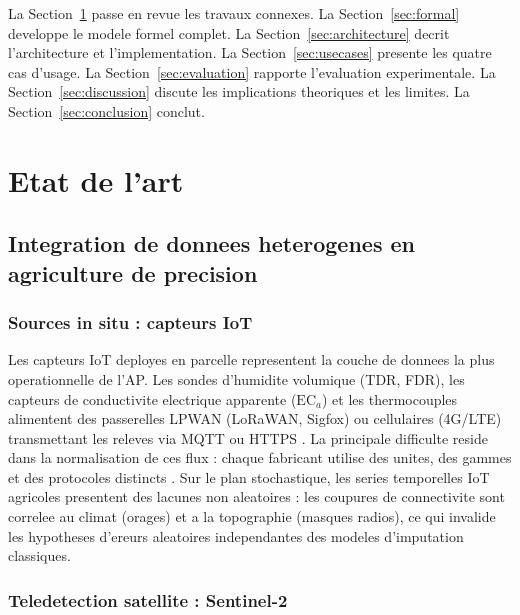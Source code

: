 \documentclass[12pt,a4paper]{article}
\theoremstyle{plain}
\theoremstyle{definition}
\theoremstyle{remark}
\begin{document}
	La Section~\ref{sec:related} passe en revue les travaux connexes.
	La Section~\ref{sec:formal} developpe le modele formel complet.
	La Section~\ref{sec:architecture} decrit l'architecture et l'implementation.
	La Section~\ref{sec:usecases} presente les quatre cas d'usage.
	La Section~\ref{sec:evaluation} rapporte l'evaluation experimentale.
	La Section~\ref{sec:discussion} discute les implications theoriques
	et les limites. La Section~\ref{sec:conclusion} conclut.
	
	\section{Etat de l'art}
	\label{sec:related}
	
	\subsection{Integration de donnees heterogenes en agriculture de precision}
	
	\subsubsection{Sources in situ : capteurs IoT}
	
	Les capteurs IoT deployes en parcelle representent la couche de donnees
	la plus operationnelle de l'AP. Les sondes d'humidite volumique (TDR,
	FDR), les capteurs de conductivite electrique apparente ($\text{EC}_a$)
	et les thermocouples alimentent des passerelles LPWAN (LoRaWAN, Sigfox)
	ou cellulaires (4G/LTE) transmettant les releves via MQTT ou HTTPS
	\cite{iot_review_2025,iot_frontiers_2025}. La principale difficulte
	reside dans la normalisation de ces flux : chaque fabricant utilise
	des unites, des gammes et des protocoles distincts
	\cite{iot_agronomy_2023}. Sur le plan stochastique, les series temporelles
	IoT agricoles presentent des lacunes non aleatoires : les coupures de
	connectivite sont correlee au climat (orages) et a la topographie
	(masques radios), ce qui invalide les hypotheses d'ereurs aleatoires
	independantes des modeles d'imputation classiques.
	
	\subsubsection{Teledetection satellite : Sentinel-2}
	
\end{document}
